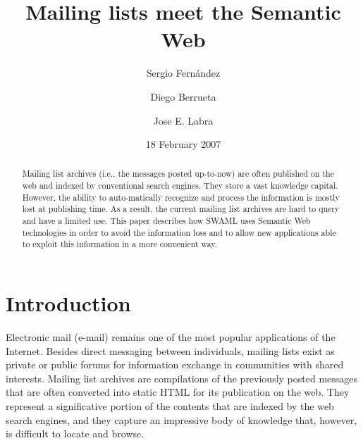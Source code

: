 \documentclass{llncs}
\begin{document}
\title{Mailing lists meet the Semantic Web}


\author{
Sergio Fern\'andez 
\and
Diego Berrueta 
\and
Jose E. Labra
}




\date{18 February 2007}

\maketitle

\begin{abstract}

Mailing list archives (i.e., the messages posted up-to-now) are often 
published on the web and indexed by conventional search engines. They 
store a vast knowledge capital. However, the ability to auto-matically 
recognize and process the information is mostly lost at publishing time. 
As a result, the current mailing list archives are hard to query and have 
a limited use. This paper describes how SWAML uses Semantic Web technologies 
in order to avoid the information loss and to allow new applications able 
to exploit this information in a more convenient way.

\end{abstract}

\section{Introduction}

Electronic mail (e-mail) remains one of the most
popular applications of the Internet. Besides direct messaging
between individuals, mailing lists exist as private or public
forums for information exchange in communities with shared interests.
Mailing list archives are compilations of the previously posted
messages that are often converted into static HTML for its
publication on the web. They represent a significative portion of
the contents that are indexed by the web search engines, and they
capture an impressive body of knowledge that, however, is difficult
to locate and browse.
\end{document}
